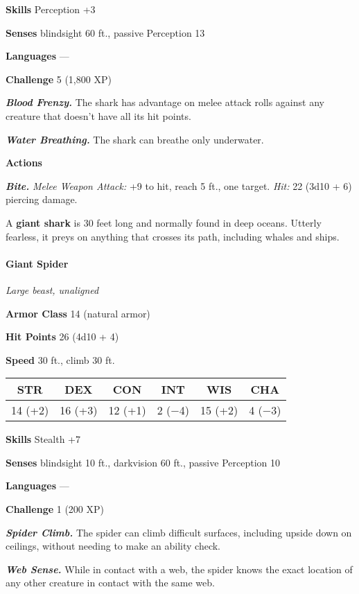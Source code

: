 \documentclass[
]{article}
\begin{document}
\textbf{Skills} Perception +3

\textbf{Senses} blindsight 60 ft., passive Perception 13

\textbf{Languages} ---

\textbf{Challenge} 5 (1,800 XP)

\emph{\textbf{Blood Frenzy.}} The shark has advantage on melee attack
rolls against any creature that doesn't have all its hit points.

\emph{\textbf{Water Breathing.}} The shark can breathe only underwater.

\textbf{Actions}

\emph{\textbf{Bite.}} \emph{Melee Weapon Attack:} +9 to hit, reach 5
ft., one target. \emph{Hit:} 22 (3d10 + 6) piercing damage.

A \textbf{giant shark} is 30 feet long and normally found in deep
oceans. Utterly fearless, it preys on anything that crosses its path,
including whales and ships.

\hypertarget{giant-spider}{%
\paragraph{Giant Spider}\label{giant-spider}}

\emph{Large beast, unaligned}

\textbf{Armor Class} 14 (natural armor)

\textbf{Hit Points} 26 (4d10 + 4)

\textbf{Speed} 30 ft., climb 30 ft.

\begin{longtable}[]{@{}cccccc@{}}
\toprule
STR & DEX & CON & INT & WIS & CHA\tabularnewline
\midrule
\endhead
14 (+2) & 16 (+3) & 12 (+1) & 2 (−4) & 15 (+2) & 4 (−3)\tabularnewline
\bottomrule
\end{longtable}

\textbf{Skills} Stealth +7

\textbf{Senses} blindsight 10 ft., darkvision 60 ft., passive Perception
10

\textbf{Languages} ---

\textbf{Challenge} 1 (200 XP)

\emph{\textbf{Spider Climb.}} The spider can climb difficult surfaces,
including upside down on ceilings, without needing to make an ability
check.

\emph{\textbf{Web Sense.}} While in contact with a web, the spider knows
the exact location of any other creature in contact with the same web.
\end{document}
